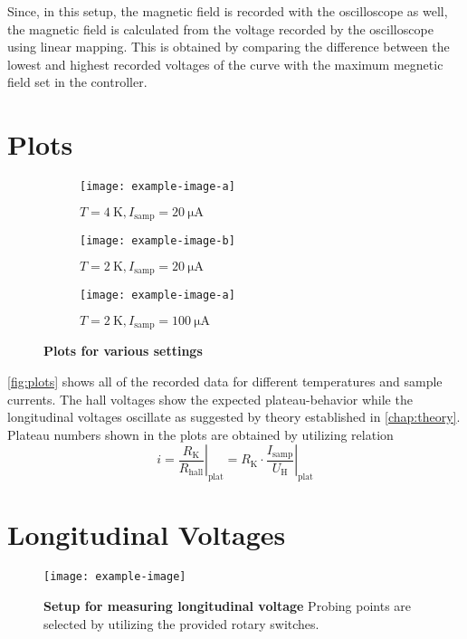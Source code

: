Since, in this setup, the magnetic field is recorded with the oscilloscope as well, the magnetic field is calculated from the voltage recorded by the oscilloscope using linear mapping.
This is obtained by comparing the difference between the lowest and highest recorded voltages of the curve with the maximum megnetic field set in the controller.

\section{Plots}
\begin{figure}
	\centering
	\begin{subfigure}{.32\textwidth}
		\centering
		\texttt{[image: example-image-a]}
		\caption{$T=\SI{4}{\kelvin}, I_\text{samp} = \SI{20}{\micro\ampere}$}
	\end{subfigure}
	\hspace*{\fill}
	\begin{subfigure}{.32\textwidth}
		\centering
		\texttt{[image: example-image-b]}
		\caption{$T=\SI{2}{\kelvin}, I_\text{samp} = \SI{20}{\micro\ampere}$}
	\end{subfigure}
	\hspace*{\fill}
	\begin{subfigure}{.32\textwidth}
		\centering
		\texttt{[image: example-image-a]}
		\caption{$T=\SI{2}{\kelvin}, I_\text{samp} = \SI{100}{\micro\ampere}$}
	\end{subfigure}
	\caption[Plots for various settings]{\textbf{Plots for various settings}}
	\label{fig:plots}
\end{figure}
\autoref{fig:plots} shows all of the recorded data for different temperatures and sample currents.
The hall voltages show the expected plateau-behavior while the longitudinal voltages oscillate as suggested by theory established in \autoref{chap:theory}.
Plateau numbers shown in the plots are obtained by utilizing relation
\begin{equation*}
	i = \left. \frac{R_\text{K}}{R_\text{hall}} \right\rvert_{\text{plat}} = R_\text{K}\cdot\left. \frac{I_\text{samp}}{U_\text{H}}\right\rvert_{\text{plat}}
\end{equation*}

\section{Longitudinal Voltages}
\begin{figure}
	\centering
	\texttt{[image: example-image]}
	\caption[Setup for measuring longitudinal voltage]{\textbf{Setup for measuring longitudinal voltage} Probing points are selected by utilizing the provided rotary switches.}
	\label{fig:setup_long_don_jon}
\end{figure}

